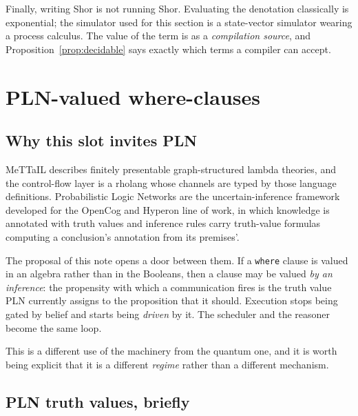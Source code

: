 \documentclass[11pt,a4paper]{article}
\theoremstyle{plain}
\theoremstyle{definition}
\theoremstyle{remark}
\begin{document}
Finally, writing Shor is not running Shor. Evaluating the denotation classically
is exponential; the simulator used for this section is a state-vector simulator
wearing a process calculus. The value of the term is as a \emph{compilation
source}, and Proposition~\ref{prop:decidable} says exactly which terms a
compiler can accept.

\section{PLN-valued where-clauses}\label{sec:pln}

\subsection{Why this slot invites PLN}

MeTTaIL describes finitely presentable graph-structured lambda theories, and the
control-flow layer is a rholang whose channels are typed by those language
definitions. Probabilistic Logic Networks are the uncertain-inference framework
developed for the OpenCog and Hyperon line of work, in which knowledge is
annotated with truth values and inference rules carry truth-value formulas
computing a conclusion's annotation from its premises'.

The proposal of this note opens a door between them. If a \texttt{where} clause
is valued in an algebra rather than in the Booleans, then a clause may be valued
\emph{by an inference}: the propensity with which a communication fires is the
truth value PLN currently assigns to the proposition that it should. Execution
stops being gated by belief and starts being \emph{driven} by it. The scheduler
and the reasoner become the same loop.

This is a different use of the machinery from the quantum one, and it is worth
being explicit that it is a different \emph{regime} rather than a different
mechanism.

\subsection{PLN truth values, briefly}
\end{document}
